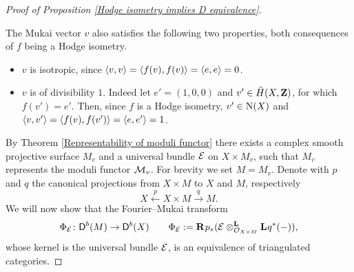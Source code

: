 \begin{proof}[Proof of Proposition \ref{Hodge isometry implies D equivalence}]
\begin{itemize}[label = $\circ$]
    \end{itemize} 
    The Mukai vector $v$ also satisfies the following two properties, both consequences of $f$ being a Hodge isometry.
    \begin{itemize}[label = $\circ$]
        \item{$v$ is isotropic, since $\pairing{v}{v} = \pairing{f(v)}{f(v)} = \pairing{e}{e} = 0$.}
        \item {$v$ is of divisibility $1$. Indeed let $e' = (1, 0, 0)$ and $v'\in \mukai{X}$, for which $f(v') = e'$. Then, since $f$ is a Hodge isometry, $v' \in \extendedNS{X}$ and $\pairing{v}{v'} = \pairing{f(v)}{f(v')} = \pairing{e}{e'} = 1$.
        }
    \end{itemize}
    By Theorem \ref{Representability of moduli functor} there exists a complex smooth projective surface $M_v$ and a universal bundle $\E$ on $X \times M_v$, such that $M_v$ represents the moduli functor $\M_v$. For brevity we set $M = M_v$. Denote with $p$ and $q$ the canonical projections from $X \times M$ to $X$ and $M$, respectively
    \[
        X \xleftarrow{\ p \ } X \times M \xrightarrow{\ q \ } M.
    \]
    We will now show that the Fourier--Mukai transform 
    \[
        \fm{\E} \colon \derb{M} \to \derb{X} \qquad \fm{\E} := \rderived{}{p_*}(\derivedtensor{\E}{\lderived{}{q^*}(-)}{\struct{X \times M}}),
    \]
    whose kernel is the universal bundle $\E$, is an equivalence of triangulated categories. 


\end{proof}
